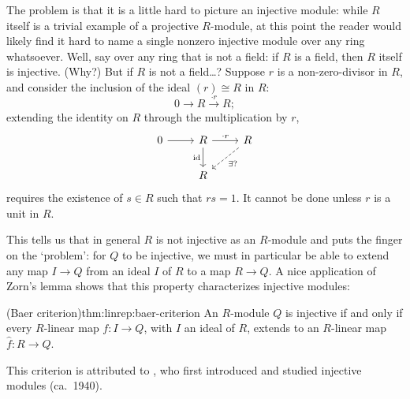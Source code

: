 The problem is that it is a little hard to picture an injective
module: while $R$ itself is a trivial example of a projective
$R$-module, at this point the reader would likely find it hard to name
a single nonzero injective module over any ring whatsoever. Well, say
over any ring that is not a field: if $R$ is a field, then $R$ itself
is injective. (Why?) But if $R$ is not a field\dots? Suppose $r$ is a
non-zero-divisor in $R$, and consider the inclusion of the ideal
$(r) \cong R$ in $R$:
\[
  0 \to R \xrightarrow{\cdot r} R;
\]
extending the identity on $R$ through the multiplication by $r$,
\[
  \begin{tikzcd}
    0 \ar[r] & R \ar[r, "\cdot r"] \ar[d, "\id"'] &
    R \ar[dl, dashed, "\exists?"] \\
    & R
  \end{tikzcd}
\]
requires the existence of $s \in R$ such that $rs = 1$. It cannot be
done unless $r$ is a unit in $R$.

This tells us that in general $R$ is not injective as an $R$-module
and puts the finger on the `problem': for $Q$ to be injective, we must
in particular be able to extend any map $I \to Q$ from an ideal $I$ of
$R$ to a map $R \to Q$. A nice application of Zorn's lemma shows that
this property characterizes injective modules:

\begin{thm}{(Baer criterion)}{thm:linrep:baer-criterion}
  An $R$-module $Q$ is injective if and only if every $R$-linear map
  $f : I \to Q$, with $I$ an ideal of $R$, extends to an $R$-linear
  map $\hat{f} : R \to Q$.
\end{thm}

This criterion is attributed to , who first
introduced and studied injective modules (ca.\ 1940).

